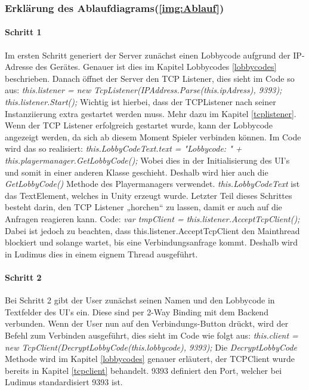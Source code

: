 \subsubsection{Erklärung des Ablaufdiagrams(\ref{img:Ablauf})}
\paragraph{Schritt 1}
Im ersten Schritt generiert der Server zunächst einen Lobbycode aufgrund der IP-Adresse des Gerätes.
Genauer ist dies im Kapitel Lobbycodes \ref{lobbycodes} beschrieben. Danach öffnet der Server den TCP Listener, dies sieht im Code so aus:
\newline \textit{ this.listener = new TcpListener(IPAddress.Parse(this.ipAdress), 9393);\newline
this.listener.Start();}\newline
Wichtig ist hierbei, dass der TCPListener nach seiner Instanziierung extra gestartet werden muss. Mehr dazu im Kapitel \ref{tcplistener}. Wenn der TCP Listener erfolgreich gestartet wurde, kann der Lobbycode angezeigt werden, da sich ab diesem Moment Spieler verbinden können. Im Code wird das so realisiert: \newline
\textit{this.LobbyCodeText.text = "Lobbycode: " + this.playermanager.GetLobbyCode();}\newline
Wobei dies in der Initialisierung des UI's und somit in einer anderen Klasse geschieht. Deshalb wird hier auch die
\textit{GetLobbyCode()} Methode des Playermanagers verwendet. \textit{this.LobbyCodeText} ist das TextElement, welches in Unity erzeugt wurde.
Letzter Teil dieses Schrittes besteht darin, den TCP Listener „horchen“ zu lassen, damit er auch auf die Anfragen reagieren kann. Code: \newline
\textit{ var tmpClient = this.listener.AcceptTcpClient();} \newline
Dabei ist jedoch zu beachten, dass this.listener.AcceptTcpClient den Mainthread blockiert und solange wartet, bis eine Verbindungsanfrage kommt. Deshalb wird in Ludimus dies in einem eignem Thread ausgeführt.
\paragraph{Schritt 2}
Bei Schritt 2 gibt der User zunächst seinen Namen und den Lobbycode in Textfelder des UI's ein. Diese sind per 2-Way Binding mit dem Backend verbunden.
Wenn der User nun auf den Verbindungs-Button drückt, wird der Befehl zum Verbinden ausgeführt, dies sieht im Code wie folgt aus: \newline
\textit{this.client = new TcpClient(DecryptLobbyCode(this.lobbycode), 9393);} \newline
Die \textit{DecryptLobbyCode} Methode wird im Kapitel \ref{lobbycodes} genauer erläutert, der TCPClient wurde bereits in Kapitel \ref{tcpclient} behandelt. 9393 definiert den Port, welcher bei Ludimus standardisiert 9393 ist.
